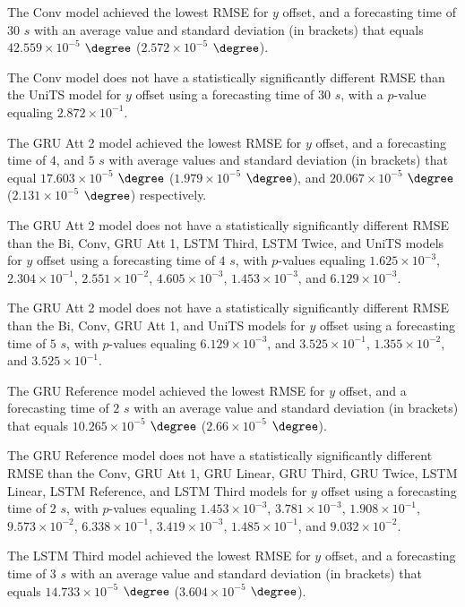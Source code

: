 The Conv model achieved the lowest RMSE for $y$ offset, and a forecasting time of $30$ $s$ with an average value and standard deviation (in brackets) that equals $42.559 \times 10^{-5}$ $\degree$ ($2.572 \times 10^{-5}$ $\degree$).

The Conv model does not have a statistically significantly different RMSE than the UniTS model for $y$ offset using a forecasting time of $30$ $s$, with a $p$-value equaling $2.872 \times 10^{-1}$.

The GRU Att 2 model achieved the lowest RMSE for $y$ offset, and a forecasting time of $4$, and $5$ $s$ with average values and standard deviation (in brackets) that equal $17.603 \times 10^{-5}$ $\degree$ ($1.979 \times 10^{-5}$ $\degree$), and $20.067 \times 10^{-5}$ $\degree$ ($2.131 \times 10^{-5}$ $\degree$) respectively.

The GRU Att 2 model does not have a statistically significantly different RMSE than the Bi, Conv, GRU Att 1, LSTM Third, LSTM Twice, and UniTS models for $y$ offset using a forecasting time of $4$ $s$, with $p$-values equaling $1.625 \times 10^{-3}$, $2.304 \times 10^{-1}$, $2.551 \times 10^{-2}$, $4.605 \times 10^{-3}$, $1.453 \times 10^{-3}$, and $6.129 \times 10^{-3}$.

The GRU Att 2 model does not have a statistically significantly different RMSE than the Bi, Conv, GRU Att 1, and UniTS models for $y$ offset using a forecasting time of $5$ $s$, with $p$-values equaling $6.129 \times 10^{-3}$, and $3.525 \times 10^{-1}$, $1.355 \times 10^{-2}$, and $3.525 \times 10^{-1}$.

The GRU Reference model achieved the lowest RMSE for $y$ offset, and a forecasting time of $2$ $s$ with an average value and standard deviation (in brackets) that equals $10.265 \times 10^{-5}$ $\degree$ ($2.66 \times 10^{-5}$ $\degree$).

The GRU Reference model does not have a statistically significantly different RMSE than the Conv, GRU Att 1, GRU Linear, GRU Third, GRU Twice, LSTM Linear, LSTM Reference, and LSTM Third models for $y$ offset using a forecasting time of $2$ $s$, with $p$-values equaling $1.453 \times 10^{-3}$, $3.781 \times 10^{-3}$, $1.908 \times 10^{-1}$, $9.573 \times 10^{-2}$, $6.338 \times 10^{-1}$, $3.419 \times 10^{-3}$, $1.485 \times 10^{-1}$, and $9.032 \times 10^{-2}$.

The LSTM Third model achieved the lowest RMSE for $y$ offset, and a forecasting time of $3$ $s$ with an average value and standard deviation (in brackets) that equals $14.733 \times 10^{-5}$ $\degree$ ($3.604 \times 10^{-5}$ $\degree$).

